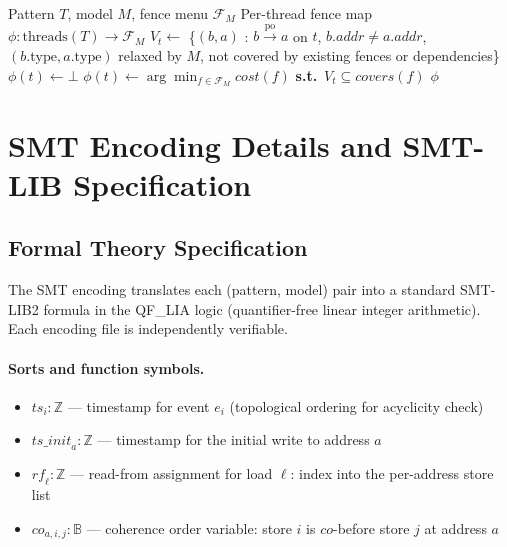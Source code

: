 \documentclass[11pt]{article}
\newcommand{\po}{\ensuremath{\xrightarrow{\text{po}}}}
\begin{document}
\begin{algorithm}[H]
\caption{Per-Thread Fence Selection}
\label{alg:fences}
\begin{algorithmic}[1]
\REQUIRE Pattern $T$, model $M$, fence menu $\mathcal{F}_M$
\ENSURE Per-thread fence map $\phi: \mathrm{threads}(T) \to \mathcal{F}_M$
    \STATE $V_t \gets$ \{$(b,a)$ : $b \po a$ on $t$, $b.addr \neq a.addr$,
           $(b.\mathrm{type}, a.\mathrm{type})$ relaxed by $M$, not
           covered by existing fences or dependencies\}
        \STATE $\phi(t) \gets \bot$
    \ELSE
        \STATE $\phi(t) \gets \arg\min_{f \in \mathcal{F}_M} \mathit{cost}(f)$
               \textbf{s.t.}\ $V_t \subseteq \mathit{covers}(f)$
    \ENDIF
\ENDFOR
\RETURN $\phi$
\end{algorithmic}
\end{algorithm}

\section{SMT Encoding Details and SMT-LIB Specification}
\label{app:smt-encoding}

\subsection*{Formal Theory Specification}

The SMT encoding translates each (pattern, model) pair into a standard
SMT-LIB2 formula in the QF\_LIA logic (quantifier-free linear integer
arithmetic).  Each encoding file is independently verifiable.

\paragraph{Sorts and function symbols.}
\begin{itemize}[nosep]
  \item $\mathit{ts}_i : \mathbb{Z}$ --- timestamp for event $e_i$
    (topological ordering for acyclicity check)
  \item $\mathit{ts\_init}_a : \mathbb{Z}$ --- timestamp for the
    initial write to address $a$
  \item $\mathit{rf}_\ell : \mathbb{Z}$ --- read-from assignment
    for load $\ell$: index into the per-address store list
  \item $\mathit{co}_{a,i,j} : \mathbb{B}$ --- coherence order
    variable: store $i$ is $\mathit{co}$-before store $j$ at address $a$
\end{itemize}
\end{document}
